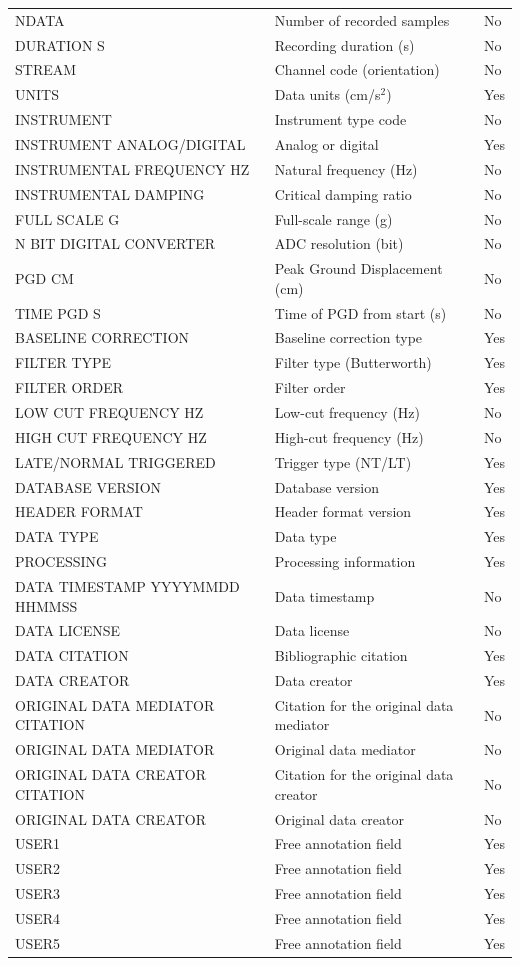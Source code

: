 \begin{longtable}{
  >{\raggedright\arraybackslash}p{4cm}  >{\raggedright\arraybackslash}p{8cm}  >{\centering\arraybackslash}p{2cm}
}
NDATA & Number of recorded samples & No \\
DURATION S & Recording duration (s) & No \\
STREAM & Channel code (orientation) & No \\
UNITS & Data units (cm/s$^2$) & Yes \\
INSTRUMENT & Instrument type code & No \\
INSTRUMENT ANALOG/DIGITAL & Analog or digital & Yes \\
INSTRUMENTAL FREQUENCY HZ & Natural frequency (Hz) & No \\
INSTRUMENTAL DAMPING & Critical damping ratio & No \\
FULL SCALE G & Full-scale range (g) & No \\
N BIT DIGITAL CONVERTER & ADC resolution (bit) & No \\
PGD CM & Peak Ground Displacement (cm) & No \\
TIME PGD S & Time of PGD from start (s) & No \\
BASELINE CORRECTION & Baseline correction type & Yes \\
FILTER TYPE & Filter type (Butterworth) & Yes \\
FILTER ORDER & Filter order & Yes \\
LOW CUT FREQUENCY HZ & Low-cut frequency (Hz) & No \\
HIGH CUT FREQUENCY HZ & High-cut frequency (Hz) & No \\
LATE/NORMAL TRIGGERED & Trigger type (NT/LT) & Yes \\
DATABASE VERSION & Database version & Yes \\
HEADER FORMAT & Header format version & Yes \\
DATA TYPE & Data type & Yes \\
PROCESSING & Processing information & Yes \\
DATA TIMESTAMP YYYYMMDD HHMMSS & Data timestamp & No \\
DATA LICENSE & Data license & No \\
DATA CITATION & Bibliographic citation & Yes \\
DATA CREATOR & Data creator & Yes \\
ORIGINAL DATA MEDIATOR CITATION & Citation for the original data mediator & No \\
ORIGINAL DATA MEDIATOR & Original data mediator & No \\
ORIGINAL DATA CREATOR CITATION & Citation for the original data creator & No \\
ORIGINAL DATA CREATOR & Original data creator & No \\
USER1 & Free annotation field & Yes \\
USER2 & Free annotation field & Yes \\
USER3 & Free annotation field & Yes \\
USER4 & Free annotation field & Yes \\
USER5 & Free annotation field & Yes \\
\end{longtable}